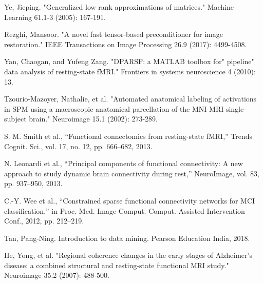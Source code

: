 \documentclass[preprint,12pt]{elsarticle}
\begin{document}
\begin{thebibliography}{1}
		
		Ye, Jieping. "Generalized low rank approximations of matrices." Machine Learning 61.1-3 (2005): 167-191.
		
	
		
		Rezghi, Mansoor. "A novel fast tensor-based preconditioner for image restoration." IEEE Transactions on Image Processing 26.9 (2017): 4499-4508.
		
		
		Yan, Chaogan, and Yufeng Zang. "DPARSF: a MATLAB toolbox for" pipeline" data analysis of resting-state fMRI." Frontiers in systems neuroscience 4 (2010): 13.
		
		
		Tzourio-Mazoyer, Nathalie, et al. "Automated anatomical labeling of activations in SPM using a macroscopic anatomical parcellation of the MNI MRI single-subject brain." Neuroimage 15.1 (2002): 273-289.
		
		
		S. M. Smith et al., “Functional connectomics from resting-state fMRI,”
		Trends Cognit. Sci., vol. 17, no. 12, pp. 666–682, 2013.
		
		N. Leonardi et al., “Principal components of functional connectivity: A
		new approach to study dynamic brain connectivity during rest,” NeuroImage,
		vol. 83, pp. 937–950, 2013.
		
		C.-Y. Wee et al., “Constrained sparse functional connectivity networks
		for MCI classification,” in Proc. Med. Image Comput. Comput.-Assisted
		Intervention Conf., 2012, pp. 212–219.
		
		Tan, Pang-Ning. Introduction to data mining. Pearson Education India, 2018.
		
		
		
		
		
		
		
		
		
		He, Yong, et al. "Regional coherence changes in the early stages of Alzheimer’s disease: a combined structural and resting-state functional MRI study." Neuroimage 35.2 (2007): 488-500.
		

\end{thebibliography}
\end{document}
